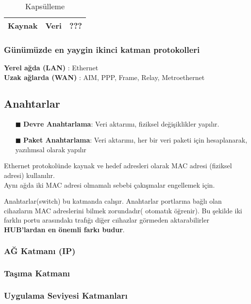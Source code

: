 \begin{table}[h]
	\centering
	\caption{Kapsülleme}
	\label{tab:table_kapsulleme}
	\begin{tabular}{|c|c|c|}
		\hline
		Kaynak & Veri & ??? \\
		\hline
	\end{tabular}
\end{table}

\subsubsection*{Günümüzde en yaygin ikinci katman protokolleri}
\textbf{Yerel ağda (LAN)} : Ethernet \\
\textbf{Uzak ağlarda (WAN)} : AIM, PPP, Frame, Relay, Metroethernet
\subsection*{Anahtarlar}
\begin{enumerate}
	\item[$\blacksquare$] \textbf{Devre Anahtarlama}: Veri aktarımı, fiziksel değişiklikler yapılır.
	\item[$\blacksquare$] \textbf{Paket Anahtarlama}: Veri aktarımı, her bir veri paketi için hesaplanarak, yazılımsal olarak yapılır
\end{enumerate}
Ethernet protokolünde kaynak ve hedef adresleri olarak MAC adresi (fiziksel adresi) kullanılır.\\
	Aynı ağda iki MAC adresi olmamalı sebebi çakışmalar engellemek için.

Anahtarlar(switch) bu katmanda calışır. Anahtarlar portlarına bağlı olan cihazların MAC adreslerini bilmek zorundadır( otomatık öğrenir). Bu şekilde iki farklıı portu arasındakı trafığı diğer cıihazlar görmeden aktarabilirler \textbf{HUB'lardan en önemli farkı budur}.
\subsubsection{AĞ Katmanı (IP) }

\subsubsection{Taşıma Katmanı}

\subsubsection{Uygulama Seviyesi Katmanları}

